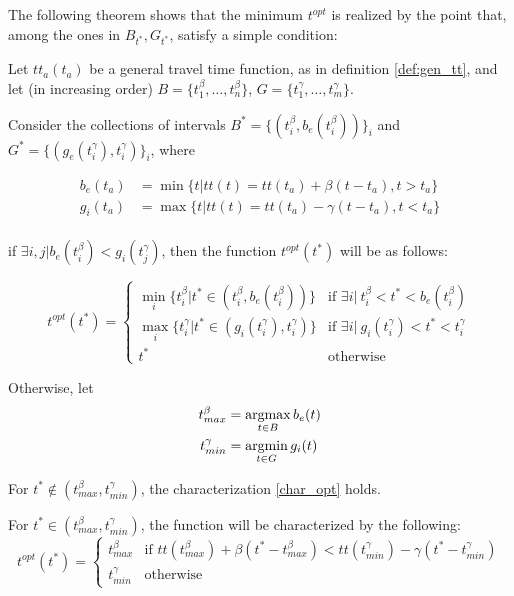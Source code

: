 The following theorem shows that the minimum \(t^{opt}\) is realized by the point that,
among the ones in \(B_{t^*}, G_{t^*}\),
satisfy a simple condition:
\begin{theorem}
    Let \(tt_a(t_a)\) be a general travel time function, as in definition \ref{def:gen_tt},
  and let (in increasing order) \(B = \{t^\beta_1, \dots, t^\beta_n\}\), \(G = \{t^\gamma_1, \dots, t^\gamma_m\}\).


  Consider the collections of intervals \(B^* = \{(t^\beta_i, b_e(t^\beta_i))\}_i\) and \(G^* = \{(g_e(t^\gamma_i), t^\gamma_i)\}_i\), where

  \begin{align*}
    b_e(t_a) & = \min\{t | tt(t) = tt(t_a) + \beta(t - t_a), t > t_a\} \\
    g_i(t_a) & = \max\{t | tt(t) = tt(t_a) - \gamma(t - t_a), t < t_a\} \\
  \end{align*}
  
  if \(\exists i, j |b_e(t^\beta_i) < g_i(t^\gamma_j)\), then the function \(t^{opt}(t^*)\) will be as follows:

  \begin{equation}
    \label{char_opt}
    t^{opt}(t^*) = 
    \begin{cases}
      \min_i \{t^\beta_i | t^* \in (t^\beta_i, b_e(t^\beta_i))\} & \text{if } \exists i |\ t^\beta_i < t^* < b_e(t^\beta_i) \\
      \max_i \{t^\gamma_i | t^* \in (g_i(t^\gamma_i), t^\gamma_i)\} & \text{if } \exists i |\ g_i(t^\gamma_i) < t^* < t^\gamma_i \\
      t^* & \text{otherwise}
    \end{cases}
  \end{equation}

  Otherwise, let
  \begin{align*}
    t^\beta_{max} & = \operatorname*{argmax}_{t \in B}b_e(t) \\
    t^\gamma_{min} & = \operatorname*{argmin}_{t \in G}g_i(t)
  \end{align*}

  For \(t^* \notin (t^\beta_{max}, t^\gamma_{min})\), the characterization \eqref{char_opt} holds.

  For \(t^* \in (t^\beta_{max}, t^\gamma_{min})\), the function will be characterized by the following:
  \begin{equation}
    \label{eq:char_strange}
    t^{opt}(t^*) =
    \begin{cases}
      t^\beta_{max} & \text{if } tt(t^\beta_{max}) + \beta(t^* - t^\beta_{max}) < tt(t^\gamma_{min}) - \gamma(t^* - t^\gamma_{min}) \\
      t^\gamma_{min} & \text{otherwise}
    \end{cases}
  \end{equation}
\end{theorem}

